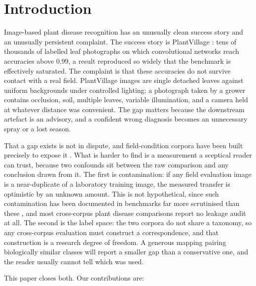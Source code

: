 \documentclass[runningheads]{llncs}
\begin{document}
\section{Introduction}

Image-based plant disease recognition has an unusually clean success story and an
unusually persistent complaint. The success story is PlantVillage
\cite{mohanty2016plantvillage}: tens of thousands of labelled leaf photographs on
which convolutional networks reach accuracies above $0.99$, a result reproduced
so widely that the benchmark is effectively saturated. The complaint is that
these accuracies do not survive contact with a real field. PlantVillage images
are single detached leaves against uniform backgrounds under controlled lighting;
a photograph taken by a grower contains occlusion, soil, multiple leaves,
variable illumination, and a camera held at whatever distance was convenient. The
gap matters because the downstream artefact is an advisory, and a confident wrong
diagnosis becomes an unnecessary spray or a lost season.

That a gap exists is not in dispute, and field-condition corpora have been built
precisely to expose it \cite{singh2020plantdoc,moupojou2023fieldplant,wei2024plantwild}.
What is harder to find is a measurement a sceptical reader can trust, because two
confounds sit between the raw comparison and any conclusion drawn from it. The
first is contamination: if any field evaluation image is a near-duplicate of a
laboratory training image, the measured transfer is optimistic by an unknown
amount. This is not hypothetical, since such contamination has been documented in
benchmarks far more scrutinised than these \cite{barz2020purging}, and most
cross-corpus plant disease comparisons report no leakage audit at all. The second
is the label space: the two corpora do not share a taxonomy, so any cross-corpus
evaluation must construct a correspondence, and that construction is a research
degree of freedom. A generous mapping pairing biologically similar classes will
report a smaller gap than a conservative one, and the reader usually cannot tell
which was used.

This paper closes both. Our contributions are:
\end{document}
